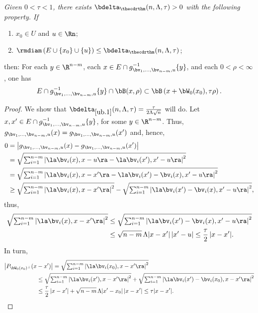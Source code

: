 \begin{Empty}[]
\label{ub.1}
{\it
Given $0 < \tau < 1$, there exists $\bdelta_{\thecdrthm}(n,\Lambda,\tau) > 0$ with the following property. If
\begin{enumerate}
\item $x_0 \in U$ and $u \in \Rn$;
\item $\rmdiam\left(E \cup \{x_0\}\cup\{u\}\right) \leq \bdelta_{\thecdrthm}(n,\Lambda,\tau)$;
\end{enumerate}
then: For each $y \in \R^{n-m}$, each $x \in E \cap g_{\bv_1,\ldots,\bv_{n-m},u}^{-1}\{y\}$, and each $0 < \rho < \infty$, one has
\begin{equation*}
E \cap g_{\bv_1,\ldots,\bv_{n-m},u}^{-1}\{y\} \cap \bB(x,\rho) \subset \bB \left(x + \bW_0(x_0),\tau \rho\right).
\end{equation*}
}
\end{Empty}

\begin{proof}
We show that $\bdelta_{\ref{ub.1}}(n,\Lambda,\tau)=\frac{\tau}{2\Lambda \sqrt{n}}$ will do.
Let $x,x' \in E \cap g_{\bv_1,\ldots,\bv_{n-m},u}^{-1}\{y\}$, for some $y \in \R^{n-m}$.
Thus, $g_{\bv_1,\ldots,\bv_{n-m},u}(x)=g_{\bv_1,\ldots,\bv_{n-m},u}(x')$ and, hence,
\begin{align*}
0 &= \left| g_{\bv_1,\ldots,\bv_{n-m},u}(x) - g_{\bv_1,\ldots,\bv_{n-m},u}(x')\right|\\
&= \sqrt{\textstyle\sum_{i=1}^{n-m} \left| \la \bv_i(x),x-u\ra - \la \bv_i(x'),x'-u\ra\right|^2} \\
&= \sqrt{\textstyle\sum_{i=1}^{n-m} \left| \la \bv_i(x),x-x'\ra - \la \bv_i(x') - \bv_i(x),x'-u \ra\right|^2}\\
&\geq \sqrt{\textstyle\sum_{i=1}^{n-m} \left| \la \bv_i(x),x-x'\ra\right|^2} - \sqrt{\textstyle\sum_{i=1}^{n-m}\left| \la \bv_i(x') - \bv_i(x),x'-u \ra\right|^2},
\end{align*}
thus,
\begin{align*}
\sqrt{\textstyle\sum_{i=1}^{n-m} \left| \la \bv_i(x),x-x'\ra\right|^2} &\leq \sqrt{\textstyle\sum_{i=1}^{n-m}\left| \la \bv_i(x') - \bv_i(x),x'-u \ra\right|^2} \\
&\leq \sqrt{n-m}\,\Lambda |x-x'|\,|x'-u| \leq \frac{\tau}{2}\,|x-x'|.
\end{align*}
In turn,
\begin{align*}
\bigl| P_{\bW_0(x_0)^\perp}(x&-x')\bigr| = \sqrt{\textstyle\sum_{i=1}^{n-m}\left|\la \bv_i(x_0),x-x' \ra \right|^2} \\
&\leq \sqrt{\textstyle\sum_{i=1}^{n-m}\left|\la \bv_i(x'),x-x' \ra \right|^2}+\sqrt{\textstyle\sum_{i=1}^{n-m}\left|\la \bv_i(x') - \bv_i(x_0),x-x' \ra \right|^2}\\
&\leq \frac{\tau}{2}\,|x-x'| + \sqrt{n-m}\,\Lambda |x'-x_0|\,|x-x'| \leq \tau |x-x'|.\qedhere
\end{align*}
\end{proof}

